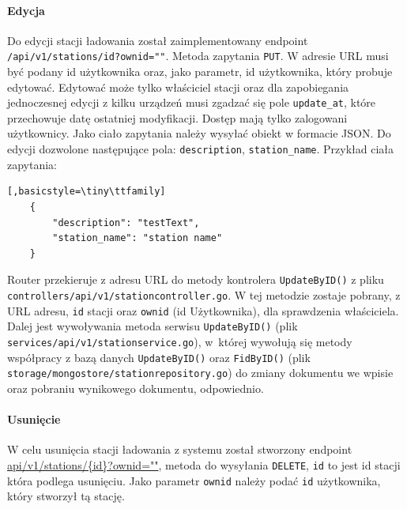 \paragraph{Edycja\newline}
Do edycji stacji ładowania został zaimplementowany endpoint \texttt{/api/v1/stations/{id}?ownid=""}.
Metoda zapytania \texttt{PUT}.
W adresie URL musi być podany id użytkownika oraz, jako parametr, id użytkownika, który probuje edytować. Edytować może tylko właściciel stacji oraz dla zapobiegania jednoczesnej edycji z kilku urządzeń musi zgadzać się pole \texttt{update\_at}, które przechowuje datę ostatniej modyfikacji.
Dostęp mają tylko zalogowani użytkownicy.
Jako ciało zapytania należy wysyłać obiekt w formacie JSON. Do edycji dozwolone następujące pola: \texttt{description}, \texttt{station\_name}.
Przykład ciała zapytania:
\begin{lstlisting}[,basicstyle=\tiny\ttfamily]
    {
		"description": "testText",
		"station_name": "station name"
    }
\end{lstlisting}

Router przekieruje z adresu URL do metody kontrolera \texttt{UpdateByID()} z pliku \texttt{controllers/api/v1/stationcontroller.go}.
W tej metodzie zostaje pobrany, z URL adresu, \texttt{id} stacji oraz \texttt{ownid} (id Użytkownika), dla sprawdzenia właściciela.
Dalej jest wywoływania metoda serwisu \texttt{UpdateByID()} (plik \texttt{services/api/v1/stationservice.go}), w~której wywołują się metody współpracy z bazą danych \texttt{UpdateByID()} oraz \texttt{FidByID()} (plik \texttt{storage/mongostore/stationrepository.go}) do zmiany dokumentu we wpisie oraz pobraniu wynikowego dokumentu, odpowiednio.


\paragraph{Usunięcie\newline}
W celu usunięcia stacji ładowania z systemu został stworzony endpoint \url{api/v1/stations/{id}?ownid=""}, metoda do wysyłania \texttt{DELETE}, \texttt{{id}} to jest id stacji która podlega usunięciu. Jako parametr \texttt{ownid} należy podać \texttt{id} użytkownika, który stworzył tą stację.

